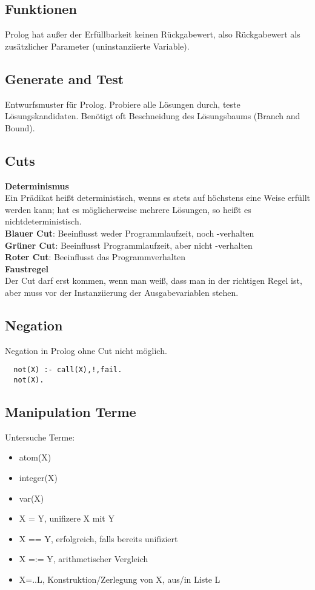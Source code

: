 \subsection{Funktionen}%
\label{lp:sub:funktionen}
Prolog hat außer der Erfüllbarkeit keinen Rückgabewert, also Rückgabewert als zusätzlicher Parameter (uninstanziierte Variable).

\subsection{Generate and Test}%
\label{lp:sub:generate-and-test}
Entwurfsmuster für Prolog. Probiere alle Lösungen durch, teste Lösungskandidaten. Benötigt oft Beschneidung des
Lösungsbaums (Branch and Bound).

\subsection{Cuts}%
\label{lp:sub:cuts}
\textbf{Determinismus}\\
Ein Prädikat heißt deterministisch, wenns es stets auf höchstens eine Weise erfüllt werden kann; hat es
möglicherweise mehrere Lösungen, so heißt es nichtdeterministisch.\\

\textbf{Blauer Cut}: Beeinflusst weder Programmlaufzeit, noch -verhalten\\
\textbf{Grüner Cut}: Beeinflusst Programmlaufzeit, aber nicht -verhalten\\
\textbf{Roter Cut}: Beeinflusst das Programmverhalten\\

\textbf{Faustregel}\\
Der Cut darf erst kommen, wenn man weiß, dass man in der richtigen Regel ist, aber muss vor der
Instanziierung der Ausgabevariablen stehen.

\subsection{Negation}%
\label{lp:sub:negation}
Negation in Prolog ohne Cut nicht möglich.
\begin{lstlisting}
  not(X) :- call(X),!,fail.
  not(X).
\end{lstlisting}

\subsection{Manipulation Terme}%
\label{lp:sub:manipulation-terme}
Untersuche Terme:
\begin{itemize}
  \item atom(X)
  \item integer(X)
  \item var(X)
  \item X = Y, unifizere X mit Y
  \item X == Y, erfolgreich, falls bereits unifiziert
  \item X =:= Y, arithmetischer Vergleich
  \item X=..L, Konstruktion/Zerlegung von X, aus/in Liste L
\end{itemize}

